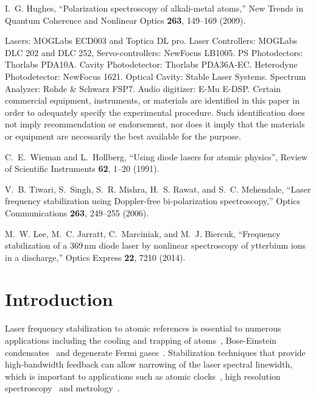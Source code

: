 \documentclass[10pt,letterpaper]{article}
\begin{document}
\begin{thebibliography}{10}
I.~G. Hughes, \enquote{Polarization spectroscopy of alkali-metal
  atoms,} New Trends in Quantum Coherence and Nonlinear Optics \textbf{263},
  149--169 (2009).

Lasers: MOGLabs ECD003 and Toptica DL pro. Laser Controllers: MOGLabs DLC 202
  and DLC 252, Servo-controllers: NewFocus LB1005. PS Photodectors: Thorlabs
  PDA10A. Cavity Photodetector: Thorlabs PDA36A-EC. Heterodyne Photodetector:
  NewFocus 1621. Optical Cavity: Stable Laser Systems. Spectrum Analyzer:
  Rohde \& Schwarz FSP7. Audio digitizer: E-Mu E-DSP. Certain commercial
  equipment, instruments, or materials are identified in this paper in order
  to adequately specify the experimental procedure. Such identification does
  not imply recommendation or endorsement, nor does it imply that the
  materials or equipment are necessarily the best available for the purpose.

C.~E.~Wieman and L.~Hollberg, \enquote{Using diode lasers for atomic physics},
Review of Scientific Instruments \textbf{62}, 1--20 (1991).

V.~B. Tiwari, S.~Singh, S.~R. Mishra, H.~S. Rawat, and S.~C. Mehendale,
  \enquote{Laser frequency stabilization using {Doppler}-free bi-polarization
  spectroscopy,} Optics Communications \textbf{263}, 249--255 (2006).

M.~W. Lee, M.~C. Jarratt, C.~Marciniak, and M.~J. Biercuk, \enquote{Frequency
  stabilization of a 369\,nm diode laser by nonlinear spectroscopy of
  ytterbium ions in a discharge,} Optics Express \textbf{22}, 7210
  (2014).

\end{thebibliography}


\section{Introduction}

Laser frequency stabilization to atomic references is essential to numerous applications including the cooling and trapping of atoms~\cite{uetake_high_2008, ye_stable_2010, akamatsu_narrow_2012}, Bose-Einstein condensates~\cite{anderson_observation_1995} and degenerate Fermi gases~\cite{demarco_onset_1999}.
Stabilization techniques that provide high-bandwidth feedback can allow narrowing of the laser spectral linewidth, which is important to applications such as atomic clocks~\cite{ludlow_sr_2008}, high resolution spectroscopy~\cite{rafac_sub-dekahertz_2000} and metrology~\cite{metcalf_laser_1999, ye_quantum_2008}.
\end{document}
